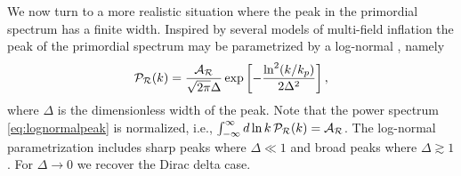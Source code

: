 \documentclass[a4paper,11pt]{article}
\numberwithin{equation}{section}
\begin{document}
We now turn to a more realistic situation where the peak in the primordial spectrum has a finite width. Inspired by several models of multi-field inflation the peak of the primordial spectrum may be parametrized by a log-normal \cite{Pi:2020otn}, namely
\begin{align}\label{eq:lognormalpeak}
\mathcal{P}_{\cal R}(k)=\frac{\mathcal{A_{\cal R}}}{\sqrt{2\pi}\Delta}\exp\left[-\frac{\ln^2(k/k_p)}{2\Delta^2}\right],
\end{align}
where $\Delta$ is the dimensionless width of the peak. Note that the power spectrum \eqref{eq:lognormalpeak} is normalized, i.e., $\int_{-\infty}^\infty d\ln k\, \mathcal{P}_{\cal R}(k)=\mathcal{A_{\cal R}}$. The log-normal parametrization includes sharp peaks where $\Delta\ll 1$ \cite{Kawasaki:1997ju,Frampton:2010sw,Kawasaki:2012wr,Inomata:2017okj,Pi:2017gih,Cai:2018tuh,Cai:2019jah,Chen:2019zza,Ashoorioon:2019xqc,Chen:2020uhe} and broad peaks where $\Delta\gtrsim1$ \cite{Garcia-Bellido:1996mdl,Yokoyama:1998pt,Kohri:2012yw,Clesse:2015wea,Cheng:2016qzb,Espinosa:2017sgp,Inomata:2017okj,Kannike:2017bxn,Garcia-Bellido:2017mdw,Ando:2017veq,Cheng:2018yyr,Ando:2018nge,Espinosa:2018eve,Inomata:2018cht,Braglia:2020eai,Palma:2020ejf,Fumagalli:2020adf}. For $\Delta\to 0$ we recover the Dirac delta case.
\end{document}
